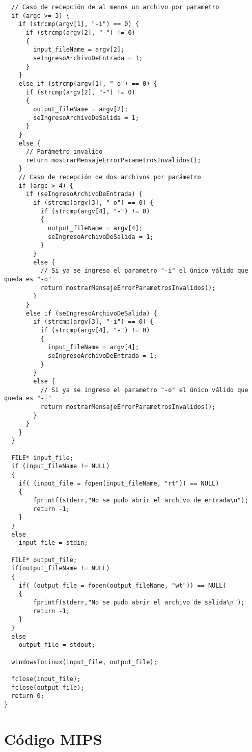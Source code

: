 \documentclass[a4paper,11pt]{article}
\begin{document}
\begin{verbatim}
  // Caso de recepción de al menos un archivo por parametro
  if (argc >= 3) {
    if (strcmp(argv[1], "-i") == 0) {
      if (strcmp(argv[2], "-") != 0)
      {
        input_fileName = argv[2];
        seIngresoArchivoDeEntrada = 1;
      }
    }
    else if (strcmp(argv[1], "-o") == 0) {
      if (strcmp(argv[2], "-") != 0)
      {
        output_fileName = argv[2];
        seIngresoArchivoDeSalida = 1;
      }
    }
    else {
      // Parámetro invalido
      return mostrarMensajeErrorParametrosInvalidos();
    }
    // Caso de recepción de dos archivos por parámetro
    if (argc > 4) {
      if (seIngresoArchivoDeEntrada) {
        if (strcmp(argv[3], "-o") == 0) {
          if (strcmp(argv[4], "-") != 0)
          {
            output_fileName = argv[4];
            seIngresoArchivoDeSalida = 1;
          }
        }
        else {
          // Si ya se ingreso el parametro "-i" el único válido que queda es "-o"
          return mostrarMensajeErrorParametrosInvalidos();
        }
      }
      else if (seIngresoArchivoDeSalida) {
        if (strcmp(argv[3], "-i") == 0) {
          if (strcmp(argv[4], "-") != 0)
          {
            input_fileName = argv[4];
            seIngresoArchivoDeEntrada = 1;
          }
        }
        else {
          // Si ya se ingreso el parametro "-o" el único válido que queda es "-i"
          return mostrarMensajeErrorParametrosInvalidos();
        }
      }
    }
  }

  FILE* input_file;
  if (input_fileName != NULL)
  {
    if( (input_file = fopen(input_fileName, "rt")) == NULL)
    {
        fprintf(stderr,"No se pudo abrir el archivo de entrada\n");
        return -1;
    }
  }
  else
    input_file = stdin;

  FILE* output_file;
  if(output_fileName != NULL)
  {
    if( (output_file = fopen(output_fileName, "wt")) == NULL)
    {
        fprintf(stderr,"No se pudo abrir el archivo de salida\n");
        return -1;
    }
  }
  else
    output_file = stdout;

  windowsToLinux(input_file, output_file);

  fclose(input_file);
  fclose(output_file);
  return 0;
}
\end{verbatim}


\section{C\'odigo MIPS}
\end{document}

